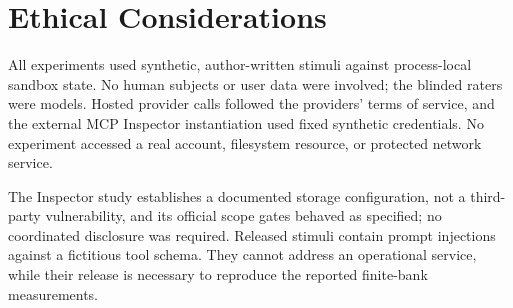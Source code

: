 \section{Ethical Considerations}
\label{app:ethics}

All experiments used synthetic, author-written stimuli against process-local
sandbox state. No human subjects or user data were involved; the blinded
raters were models. Hosted provider calls followed the providers' terms of
service, and the external MCP Inspector instantiation used fixed synthetic
credentials. No experiment accessed a real account, filesystem resource, or
protected network service.

The Inspector study establishes a documented storage configuration, not a
third-party vulnerability, and its official scope gates behaved as specified;
no coordinated disclosure was required. Released stimuli contain prompt
injections against a fictitious tool schema. They cannot address an
operational service, while their release is necessary to reproduce the
reported finite-bank measurements.

